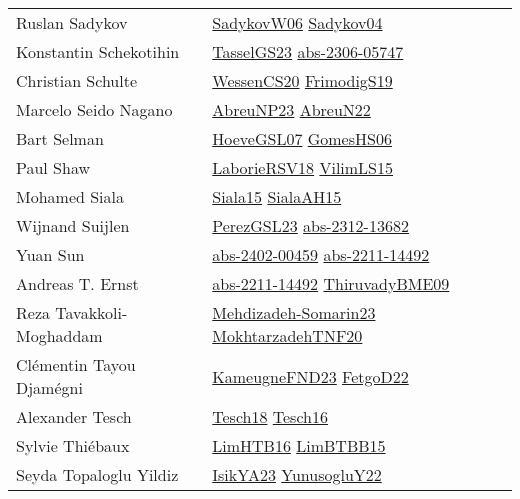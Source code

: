 {\begin{longtable}{p{4cm}p{20cm}}
Ruslan Sadykov & \href{}{SadykovW06}\cite{SadykovW06} \href{papers/Sadykov04.pdf}{Sadykov04}\cite{Sadykov04} \\
Konstantin Schekotihin & \href{papers/TasselGS23.pdf}{TasselGS23}\cite{TasselGS23} \href{articles/abs-2306-05747.pdf}{abs-2306-05747}\cite{abs-2306-05747} \\
Christian Schulte & \href{papers/WessenCS20.pdf}{WessenCS20}\cite{WessenCS20} \href{papers/FrimodigS19.pdf}{FrimodigS19}\cite{FrimodigS19} \\
Marcelo Seido Nagano & \href{}{AbreuNP23}\cite{AbreuNP23} \href{articles/AbreuN22.pdf}{AbreuN22}\cite{AbreuN22} \\
Bart Selman & \href{papers/HoeveGSL07.pdf}{HoeveGSL07}\cite{HoeveGSL07} \href{papers/GomesHS06.pdf}{GomesHS06}\cite{GomesHS06} \\
Paul Shaw & \href{articles/LaborieRSV18.pdf}{LaborieRSV18}\cite{LaborieRSV18} \href{papers/VilimLS15.pdf}{VilimLS15}\cite{VilimLS15} \\
Mohamed Siala & \href{articles/Siala15.pdf}{Siala15}\cite{Siala15} \href{papers/SialaAH15.pdf}{SialaAH15}\cite{SialaAH15} \\
Wijnand Suijlen & \href{papers/PerezGSL23.pdf}{PerezGSL23}\cite{PerezGSL23} \href{articles/abs-2312-13682.pdf}{abs-2312-13682}\cite{abs-2312-13682} \\
Yuan Sun & \href{articles/abs-2402-00459.pdf}{abs-2402-00459}\cite{abs-2402-00459} \href{articles/abs-2211-14492.pdf}{abs-2211-14492}\cite{abs-2211-14492} \\
Andreas T. Ernst & \href{articles/abs-2211-14492.pdf}{abs-2211-14492}\cite{abs-2211-14492} \href{papers/ThiruvadyBME09.pdf}{ThiruvadyBME09}\cite{ThiruvadyBME09} \\
Reza Tavakkoli{-}Moghaddam & \href{papers/Mehdizadeh-Somarin23.pdf}{Mehdizadeh-Somarin23}\cite{Mehdizadeh-Somarin23} \href{}{MokhtarzadehTNF20}\cite{MokhtarzadehTNF20} \\
Cl{\'{e}}mentin Tayou Djam{\'{e}}gni & \href{papers/KameugneFND23.pdf}{KameugneFND23}\cite{KameugneFND23} \href{articles/FetgoD22.pdf}{FetgoD22}\cite{FetgoD22} \\
Alexander Tesch & \href{papers/Tesch18.pdf}{Tesch18}\cite{Tesch18} \href{papers/Tesch16.pdf}{Tesch16}\cite{Tesch16} \\
Sylvie Thi{\'{e}}baux & \href{papers/LimHTB16.pdf}{LimHTB16}\cite{LimHTB16} \href{papers/LimBTBB15.pdf}{LimBTBB15}\cite{LimBTBB15} \\
Seyda Topaloglu Yildiz & \href{articles/IsikYA23.pdf}{IsikYA23}\cite{IsikYA23} \href{}{YunusogluY22}\cite{YunusogluY22} \\

\end{longtable}}
